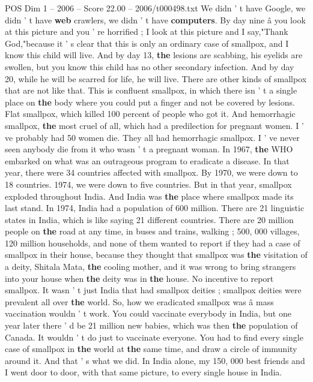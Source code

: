 \begin{textsample}{POS Dim 1 – 2006 – Score 22.00 – 2006/t000498.txt}
We didn ' t have Google, we didn ' t have \textbf{web} crawlers, we didn ' t have \textbf{computers}.
By day nine â you look at this picture and you ' re horrified ; I look at this picture and I say,"Thank God,"because it ' s clear that this is only an ordinary case of smallpox, and I know this child will live.
And by day 13, \textbf{the} lesions are scabbing, his eyelids are swollen, but you know this child has no other secondary infection.
And by day 20, while he will be scarred for life, he will live.
There are other kinds of smallpox that are not like that.
This is confluent smallpox, in which there isn ' t a single place on \textbf{the} body where you could put a finger and not be covered by lesions.
Flat smallpox, which killed 100 percent of people who got it.
And hemorrhagic smallpox, \textbf{the} most cruel of all, which had a predilection for pregnant women.
I ' ve probably had 50 women die.
They all had hemorrhagic smallpox.
I ' ve never seen anybody die from it who wasn ' t a pregnant woman.
In 1967, \textbf{the} WHO embarked on what was an outrageous program to eradicate a disease.
In that year, there were 34 countries affected with smallpox.
By 1970, we were down to 18 countries. 1974, we were down to five countries.
But in that year, smallpox exploded throughout India.
And India was \textbf{the} place where smallpox made its last stand.
In 1974, India had a population of 600 million.
There are 21 linguistic states in India, which is like saying 21 different countries.
There are 20 million people on \textbf{the} road at any time, in buses and trains, walking ; 500, 000 villages, 120 million households, and none of them wanted to report if they had a case of smallpox in their house, because they thought that smallpox was \textbf{the} visitation of a deity, Shitala Mata, \textbf{the} cooling mother, and it was wrong to bring strangers into your house when \textbf{the} deity was in \textbf{the} house.
No incentive to report smallpox.
It wasn ' t just India that had smallpox deities ; smallpox deities were prevalent all over \textbf{the} world.
So, how we eradicated smallpox was â mass vaccination wouldn ' t work.
You could vaccinate everybody in India, but one year later there ' d be 21 million new babies, which was then \textbf{the} population of Canada.
It wouldn ' t do just to vaccinate everyone.
You had to find every single case of smallpox in \textbf{the} world at \textbf{the} same time, and draw a circle of immunity around it.
And that ' s what we did.
In India alone, my 150, 000 best friends and I went door to door, with that same picture, to every single house in India.

\end{textsample}
